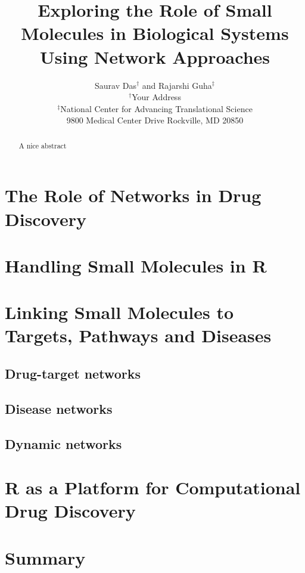 \documentclass[12pt,letterpaper]{article}
\begin{document}
\title{Exploring the Role of Small Molecules in Biological Systems Using Network Approaches}
\author{Saurav Das$^\dagger$ and Rajarshi Guha$^\ddagger$\\
$^\dagger$Your Address \\
$^\ddagger$National Center for Advancing Translational Science \\ 9800 Medical Center Drive  Rockville, MD 20850}
\date{}

\maketitle
\begin{abstract}
A nice abstract
\end{abstract}

\section{The Role of Networks in Drug Discovery}
\label{sec:role-networks-drug}

\section{Handling Small Molecules in R}
\label{sec:handl-small-molec}

\section{Linking Small Molecules to Targets, Pathways and Diseases}
\label{sec:link-small-molec}

\subsection{Drug-target networks}
\label{sec:drug-target-networks}


\subsection{Disease networks}
\label{sec:disease-networks}

\subsection{Dynamic networks}
\label{sec:dynamic-networks}


\section{R as a Platform for Computational Drug Discovery}
\label{sec:r-as-platform}

\section{Summary}
\label{sec:summary}
\end{document}

